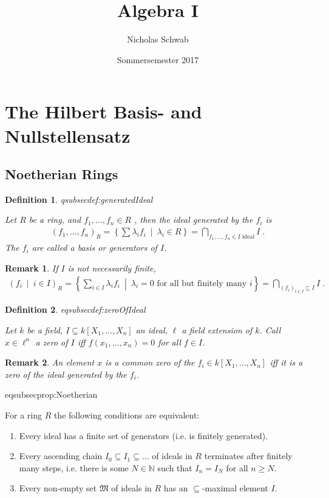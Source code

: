 \documentclass[DIV=14,parskip=full,pointednumbers]{scrartcl}
\title{Algebra I}
\author{Nicholas Schwab}
\date{Sommersemester 2017}
\newenvironment{alphanumerate}{\begin{enumerate}[label={$(\alph*)$},ref=\curthm]}{\end{enumerate}}
\theoremstyle{cthm}
\theoremstyle{cvarthm}
\theoremstyle{cdef}
\newtheorem{defi}{Definition}[subsection]
\newtheorem{rem}{Remark}[subsection]
\newcommand{\lbl}[1]{
	\label{#1}
	\ifmmode
	\expandafter\xdef\csname eqsubsec#1\endcsname{\thesubsection}
	\fi
}
\newcommand{\IN}{\mathbb{N}}
\newcommand{\st}{\ \middle|\ }
\begin{document}
	
	\maketitle
	\tableofcontents
	\section{The Hilbert Basis- and Nullstellensatz}
	\subsection{Noetherian Rings}
	\begin{defi}\lbl{def:generatedIdeal}
		Let $R$ be a ring, and $f_1,\ldots, f_n\in R$ , then  the \emph{ideal generated by the $f_i$} is
		\begin{align*}\left( f_1,\ldots,  f_n\right)_R = \left\{\sum\lambda_i f_i\st\lambda_i \in R\right\} = \bigcap_{f_1,\ldots,f_n\in I\text{ ideal}} I\;.
		\end{align*}
		The $f_i$ are called a \emph{basis} or \emph{generators} of $I$. 
	\end{defi}
	\begin{rem}
		If $I$ is not necessarily finite, 
		\begin{align*}
		\left( f_i\st i\in I\right)_R = \left\{\sum_{i\in I} \lambda_i f_i \st\lambda_i = 0 \text{ for all but finitely many } i\right\} = \bigcap_{(f_i)_{i\in I}\subseteq I} I\;.
		\end{align*}
	\end{rem}
	\begin{defi}\lbl{def:zeroOfIdeal}
		Let $k$ be a field, $I\subseteq k[X_1,\ldots, X_n]$ an ideal, $\ell$ a field extension of $k$. Call $x\in \ell^n$ a \emph{zero} of $I$ iff $f(x_1,\ldots,x_n) = 0$ for all $f\in I$. 
	\end{defi}
	\begin{rem}
		An element $x$ is a common zero of the $f_i\in k[X_1,\ldots,X_n]$ iff it is a zero of the ideal generated by the $f_i$.
	\end{rem}
	\begin{prop}\lbl{prop:Noetherian}
		For a ring $R$ the following conditions are equivalent:
		\begin{alphanumerate}
			\item Every ideal has a finite set of generators (i.e. is finitely generated).
			\item Every ascending chain $I_0 \subseteq I_1 \subseteq \ldots$ of ideals in $R$ terminates after finitely many steps, i.e. there is some $N\in\IN$ such that $I_n=I_N$ for all $n\geq N$.
			\item Every non-empty set $\mathfrak{M}$ of ideals in $R$ has an $\subseteq$-maximal element $I$. 
		\end{alphanumerate}
	\end{prop}
	
\end{document}
